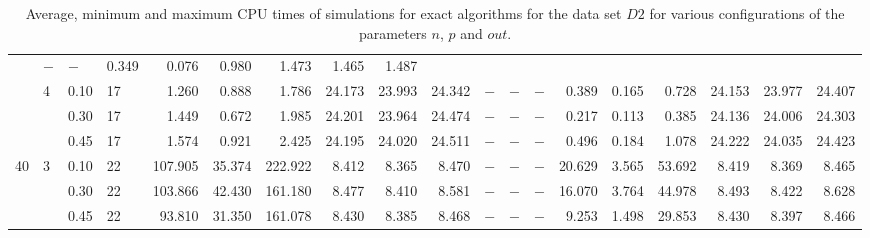 \documentclass[thesis=B,english]{FITthesis}[2012/10/20]
\begin{document}
\begin{table}[h!]
\begin{adjustbox}{angle=90}
{\begin{tabular}{l|l|l|l|r|r|r|r|r|r|r|r|r|r|r|r|r|r|r|}
&     $-$ &     $-$ &       0.349 &  0.076 &   0.980 &       1.473 &   1.465 &   1.487 \\   & 4 & 0.10 & 17 &    1.260 &   0.888 &    1.786 &  24.173 &  23.993 &  24.342 &     $-$ &     $-$ &     $-$ &       0.389 &  0.165 &   0.728 &      24.153 &  23.977 &  24.407 \\   &   & 0.30 & 17 &    1.449 &   0.672 &    1.985 &  24.201 &  23.964 &  24.474 &     $-$ &     $-$ &     $-$ &       0.217 &  0.113 &   0.385 &      24.136 &  24.006 &  24.303 \\   &   & 0.45 & 17 &    1.574 &   0.921 &    2.425 &  24.195 &  24.020 &  24.511 &     $-$ &     $-$ &     $-$ &       0.496 &  0.184 &   1.078 &      24.222 &  24.035 &  24.423 \\40 & 3 & 0.10 & 22 &  107.905 &  35.374 &  222.922 &   8.412 &   8.365 &   8.470 &     $-$ &     $-$ &     $-$ &      20.629 &  3.565 &  53.692 &       8.419 &   8.369 &   8.465 \\   &   & 0.30 & 22 &  103.866 &  42.430 &  161.180 &   8.477 &   8.410 &   8.581 &     $-$ &     $-$ &     $-$ &      16.070 &  3.764 &  44.978 &       8.493 &   8.422 &   8.628 \\   &   & 0.45 & 22 &   93.810 &  31.350 &  161.078 &   8.430 &   8.385 &   8.468 &     $-$ &     $-$ &     $-$ &       9.253 &  1.498 &  29.853 &       8.430 &   8.397 &   8.466 \\
			 \hline 
			\end{tabular} 
			
			
			
			}
			
\end{adjustbox}
    
    \caption{Average, minimum and maximum CPU times of simulations for exact algorithms for the data set $D2$ for various configurations of the parameters $n$, $p$ and $out$.}
    \label{table:exact:2}
\end{table}
\end{document}
